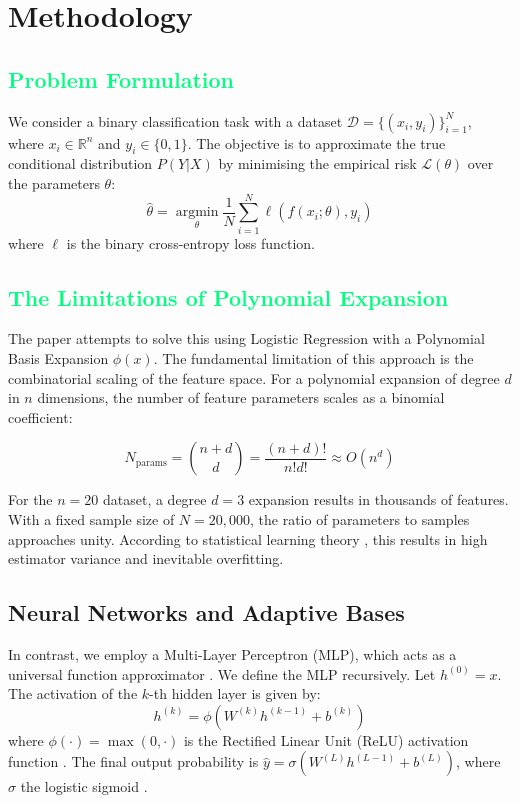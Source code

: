 \documentclass{article}
\newcommand{\csection}[1]{\section{\textcolor{imperialblue}{#1}}}
\newcommand{\csubsection}[1]{\subsection{\textcolor{springgreen}{#1}}}
\begin{document}
\csection{Methodology}
\label{submission}

\csubsection{Problem Formulation}

We consider a binary classification task with a dataset $\mathcal{D} = \{(x_i, y_i)\}_{i=1}^{N}$, where $x_i \in \mathbb{R}^n$ and $y_i \in \{0, 1\}$. The objective is to approximate the true conditional distribution $P(Y|X)$ by minimising the empirical risk $\mathcal{L}(\theta)$ over the parameters $\theta$:
\begin{equation}
    \hat{\theta} = \operatorname*{argmin}_{\theta} \frac{1}{N} \sum_{i=1}^{N} \ell(f(x_i; \theta), y_i)
\end{equation}
where $\ell$ is the binary cross-entropy loss function.

\csubsection{The Limitations of Polynomial Expansion}

The paper \citep{harley2025} attempts to solve this using Logistic Regression with a Polynomial Basis Expansion $\phi(x)$. The fundamental limitation of this approach is the combinatorial scaling of the feature space. For a polynomial expansion of degree $d$ in $n$ dimensions, the number of feature parameters scales as a binomial coefficient:

\begin{equation}
    N_{\text{params}} = \binom{n+d}{d} = \frac{(n+d)!}{n!d!} \approx O(n^d)
\end{equation}

For the $n=20$ dataset, a degree $d=3$ expansion results in thousands of features. With a fixed sample size of $N = 20,000$, the ratio of parameters to samples approaches unity. According to statistical learning theory \citep{hastie2009}, this results in high estimator variance and inevitable overfitting.

\subsection{Neural Networks and Adaptive Bases}

In contrast, we employ a Multi-Layer Perceptron (MLP), which acts as a universal function approximator \citep{hornik1991}. We define the MLP recursively. Let $h^(0) = x$. The activation of the $k$-th hidden layer is given by:
\begin{equation}
    h^{(k)} = \phi(W^{(k)}h^{(k-1)} + b^{(k)})     
\end{equation}
where  $\phi(\cdot) = \max(0, \cdot)$ is the Rectified Linear Unit (ReLU) activation function \citep{10.5555/3104322.3104425}. The final output probability is $\hat{y} = \sigma(W^{(L)}h^{(L-1)} + b^{(L)})$, where $\sigma$ the logistic sigmoid \citep{cybenko1989}.
\end{document}
